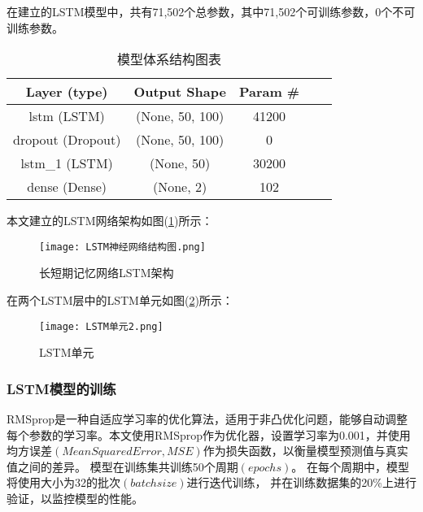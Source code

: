 \documentclass[withoutpreface,bwprint]{cumcmthesis}  %
\begin{document}
            在建立的LSTM模型中，共有71,502个总参数，其中71,502个可训练参数，0个不可训练参数。
                        \begin{table}[h] 
                            \centering
                            \caption{模型体系结构图表} 
                            \begin{tabular}{ccccc}  
                                \toprule  
                                    Layer (type) & Output Shape & Param \#   \\  
                                \midrule  
                                    lstm (LSTM) & (None, 50, 100) & 41200    \\  
                                    dropout (Dropout) & (None, 50, 100) & 0  \\  
                                    lstm\_1 (LSTM) & (None, 50) & 30200      \\  
                                    dense (Dense) & (None, 2) & 102          \\  
                                \bottomrule  
                            \end{tabular}  
                             
                        \end{table}  
                        
        本文建立的LSTM网络架构如图(\ref{LSTM})所示：                
        \begin{figure}[ht]
		  \centering
		  \texttt{[image: LSTM神经网络结构图.png]}
		  \caption{长短期记忆网络LSTM架构}
            \label{LSTM}
        \end{figure}
 
        在两个LSTM层中的LSTM单元如图(\ref{lstm})所示：
        \begin{figure}[ht]           
		  \centering
		  \texttt{[image: LSTM单元2.png]}
		  \caption{LSTM单元}
            \label{lstm}
	\end{figure}
                        
        \subsubsection{LSTM模型的训练}
            RMSprop是一种自适应学习率的优化算法，适用于非凸优化问题，能够自动调整每个参数的学习率。本文使用RMSprop作为优化器，设置学习率为0.001，并使用均方误差$(Mean Squared Error, MSE)$作为损失函数，以衡量模型预测值与真实值之间的差异。
            模型在训练集共训练50个周期$(epochs)$。
            在每个周期中，模型将使用大小为32的批次$(batch size)$进行迭代训练，
            并在训练数据集的20\%上进行验证，以监控模型的性能。
\end{document}

